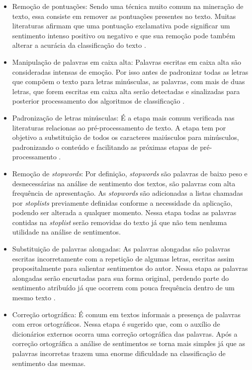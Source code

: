 \begin{itemize}
\item Remoção de pontuações: Sendo uma técnica muito comum na mineração de texto, essa consiste em remover as pontuações presentes no texto. Muitas literaturas afirmam que uma pontuação exclamativa pode significar um sentimento intenso positivo ou negativo e que sua remoção pode também alterar a acurácia da classificação do texto \cite{Lin2009}.

\item Manipulação de palavras em caixa alta: Palavras escritas em caixa alta são consideradas intensas de emoção. Por isso antes de padronizar todas as letras que compõem o texto para letras minúsculas, as palavras, com mais de duas letras, que forem escritas em caixa alta serão detectadas e sinalizadas para posterior processamento dos algoritmos de classificação .

\item Padronização de letras minúsculas: É a etapa mais comum verificada nas literaturas relacionas ao pré-processamento de texto. A etapa tem por objetivo a substituição de todos os caracteres maiúsculos para minúsculos, padronizando o conteúdo e facilitando as próximas etapas de pré-processamento \cite{DBLP:conf/coling/SantosG14}.

\item Remoção de \textit{stopwords}: Por definição, \textit{stopwords} são palavras de baixo peso e desnecessárias na análise de sentimento dos textos, são palavras com alta frequência de apresentação.  As \textit{stopwords} são adicionadas a listas chamadas por \textit{stoplists} previamente definidas conforme a necessidade da aplicação, podendo ser alterada a qualquer momento. Nessa etapa todas as palavras contidas na \textit{stoplist} serão removidas do texto já que não tem nenhuma utilidade na análise de sentimentos.

\item Substituição de palavras alongadas: As palavras alongadas são palavras escritas incorretamente com a repetição de algumas letras, escritas assim propositalmente para salientar sentimentos do autor. Nessa etapa as palavras alongadas serão encurtadas para sua forma original, perdendo parte do sentimento atribuído já que ocorrem com pouca frequência dentro de um mesmo texto \cite{Mohammad2015}.

\item Correção ortográfica: É comum em textos informais a presença de palavras com erros ortográficos. Nessa etapa é sugerido que, com o auxílio de dicionários externos ocorra uma correção ortográfica das palavras. Após a correção ortográfica a análise de sentimentos se torna mais simples já que as palavras incorretas trazem uma enorme dificuldade na classificação de sentimento das mesmas.


\end{itemize}
